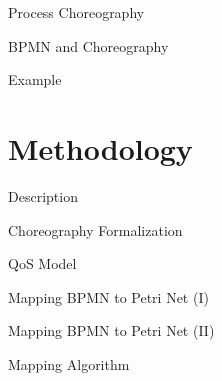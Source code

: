 \documentclass[xcolor=svgnames]{beamer}
\begin{document}
  \begin{frame}{Process Choreography}
   
  \end{frame}

  \begin{frame}{BPMN and Choreography}
   
  \end{frame}

  \begin{frame}{Example}
   
  \end{frame}



\section{Methodology}
  \begin{frame}{Description}
  
  \end{frame}


  \begin{frame}{Choreography Formalization}
   
  \end{frame}

  
  \begin{frame}{QoS Model}
   
  \end{frame}


  \begin{frame}{Mapping BPMN to Petri Net (I)}
   
  \end{frame}


  \begin{frame}{Mapping BPMN to Petri Net (II)}
   
  \end{frame}

  
  \begin{frame}{Mapping Algorithm }
   
  \end{frame}
  


  

\end{document}
